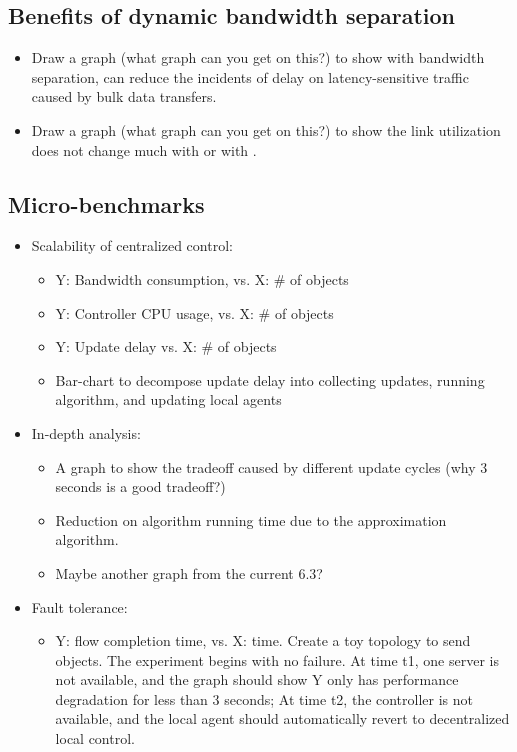\subsection{Benefits of dynamic bandwidth separation}
\begin{itemize}
\item Draw a graph (what graph can you get on this?) to show with bandwidth separation, \name can reduce the incidents of delay on latency-sensitive traffic caused by bulk data transfers.
\item Draw a graph (what graph can you get on this?) to show the link utilization does not change much with \name or with \company.
\end{itemize}

\subsection{Micro-benchmarks}
\begin{itemize}
\item Scalability of centralized control:
\begin{itemize}
\item Y: Bandwidth consumption, vs. X: \# of objects
\item Y: Controller CPU usage, vs. X: \# of objects
\item Y: Update delay vs. X: \# of objects
\item Bar-chart to decompose update delay into collecting updates, running algorithm, and updating local agents
\end{itemize}

\item In-depth analysis:
\begin{itemize}
\item A graph to show the tradeoff caused by different update cycles (why 3 seconds is a good tradeoff?)
\item Reduction on algorithm running time due to the approximation algorithm.
\item Maybe another graph from the current 6.3?
\end{itemize}

\item Fault tolerance:
\begin{itemize}
\item Y: flow completion time, vs. X: time. Create a toy topology to send objects. The experiment begins with no failure. At time t1, one server is not available, and the graph should show Y only has performance degradation for less than 3 seconds; At time t2, the controller is not available, and the local agent should automatically revert to decentralized local control.
\end{itemize}

\end{itemize}




